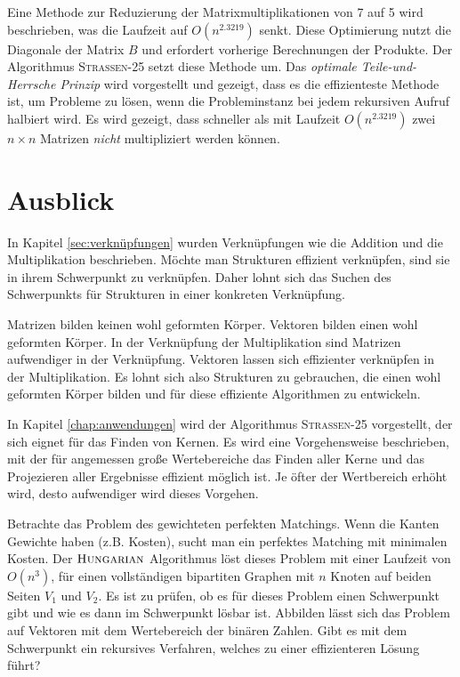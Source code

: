 \documentclass{report}
\numberwithin{equation}{section}
\begin{document}
Eine Methode zur Reduzierung der Matrixmultiplikationen von 7 auf 5 wird beschrieben, was die Laufzeit auf $O(n^{2.3219})$ senkt. Diese Optimierung nutzt die Diagonale der Matrix $B$ und erfordert vorherige Berechnungen der Produkte. Der Algorithmus \textsc{Strassen-25} setzt diese Methode um. Das \textit{optimale Teile-und-Herrsche Prinzip} wird vorgestellt und gezeigt, dass es die effizienteste Methode ist, um Probleme zu lösen, wenn die Probleminstanz bei jedem rekursiven Aufruf halbiert wird. Es wird gezeigt, dass schneller als mit Laufzeit $O(n^{2.3219})$ zwei $n \times n$ Matrizen \textit{nicht} multipliziert werden können.

\section{Ausblick}
In Kapitel \ref{sec:verknüpfungen} wurden Verknüpfungen wie die Addition und die Multiplikation beschrieben. Möchte man Strukturen effizient verknüpfen, sind sie in ihrem Schwerpunkt zu verknüpfen. Daher lohnt sich das Suchen des Schwerpunkts für Strukturen in einer konkreten Verknüpfung.

Matrizen bilden keinen wohl geformten Körper. Vektoren bilden einen wohl geformten Körper. In der Verknüpfung der Multiplikation sind Matrizen aufwendiger in der Verknüpfung. Vektoren lassen sich effizienter verknüpfen in der Multiplikation. Es lohnt sich also Strukturen zu gebrauchen, die einen wohl geformten Körper bilden und für diese effiziente Algorithmen zu entwickeln.

In Kapitel \ref{chap:anwendungen} wird der Algorithmus \textsc{Strassen-25} vorgestellt, der sich eignet für das Finden von Kernen. Es wird eine Vorgehensweise beschrieben, mit der für angemessen große Wertebereiche das Finden aller Kerne und das Projezieren aller Ergebnisse effizient möglich ist. Je öfter der Wertbereich erhöht wird, desto aufwendiger wird dieses Vorgehen.

Betrachte das Problem des gewichteten perfekten Matchings. Wenn die Kanten Gewichte haben (z.B. Kosten), sucht man ein perfektes Matching mit minimalen Kosten. Der $\textsc{Hungarian}$ Algorithmus löst dieses Problem mit einer Laufzeit von $O(n^3)$, für einen vollständigen bipartiten Graphen mit $n$ Knoten auf beiden Seiten $V_1$ und $V_2$. Es ist zu prüfen, ob es für dieses Problem einen Schwerpunkt gibt und wie es dann im Schwerpunkt lösbar ist. Abbilden lässt sich das Problem auf Vektoren mit dem Wertebereich der binären Zahlen. Gibt es mit dem Schwerpunkt ein rekursives Verfahren, welches zu einer effizienteren Lösung führt?
\end{document}
